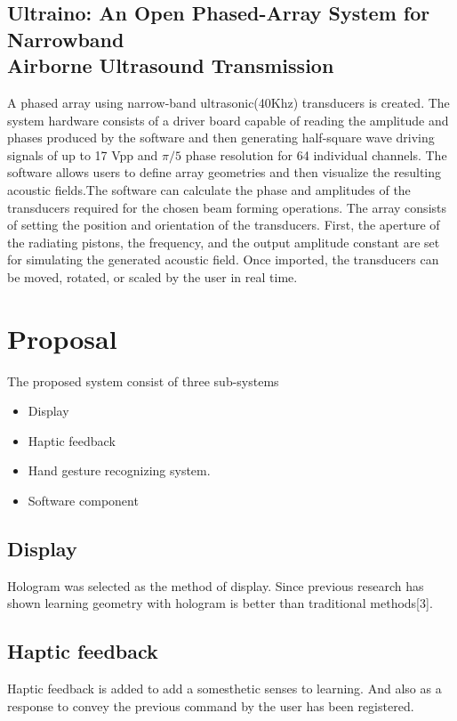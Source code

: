 \documentclass{fisatproject}
\begin{document}
\subsection{\normalsize Ultraino: An Open Phased-Array System for Narrowband\\ Airborne Ultrasound Transmission}
A phased array using narrow-band ultrasonic(40Khz) transducers is created. The system hardware consists of a driver board capable of reading  the  amplitude  and  phases  produced  by  the  software and then generating half-square wave driving signals of up to 17 Vpp and $\pi /5$ phase resolution for 64 individual channels.
The  software allows users to define array geometries  and  then  visualize  the  resulting  acoustic  fields.The  software  can  calculate  the  phase  and  amplitudes  of  the transducers required for the  chosen  beam forming operations.\newline
The array   consists  of  setting  the  position  and  orientation  of  the transducers.
First, the  aperture  of  the  radiating  pistons,  the frequency,  and  the  output  amplitude  constant  are  set  for simulating  the  generated  acoustic  field. Once  imported,  the  transducers  can  be  moved,  rotated,  or scaled by the user in real time.
\newpage
\section{Proposal}
The proposed system consist of three sub-systems
\begin{itemize}
    \item  Display
    \item Haptic feedback
    \item Hand gesture recognizing system.
    \item Software component
\end{itemize}
\subsection{Display}
Hologram was selected as the method of display. Since previous  research has shown learning geometry with hologram is better than traditional methods[3].

\subsection{Haptic feedback}
Haptic feedback is added to add a somesthetic senses to learning. And also as a response to convey the previous command by the user has been registered.
\end{document}
